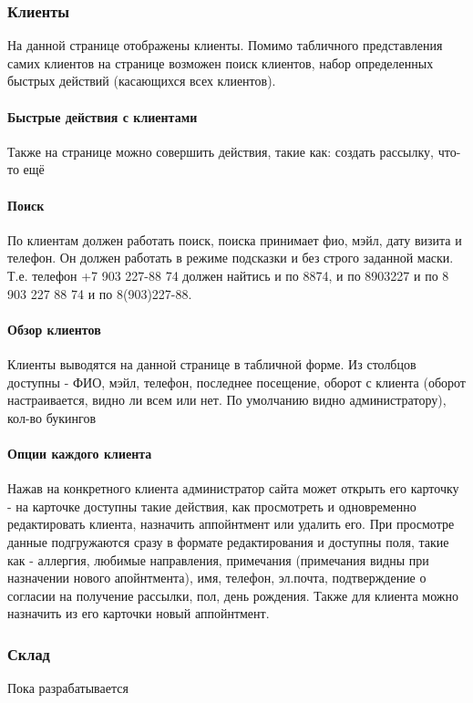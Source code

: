 \documentclass[DIV=calc, paper=a4, fontsize=11pt]{scrartcl} %
\begin{document}
\subsubsection{Клиенты}
На данной странице отображены клиенты. Помимо табличного представления самих клиентов на странице возможен поиск клиентов, набор определенных быстрых действий (касающихся всех клиентов). 

\paragraph{Быстрые действия с клиентами} Также на странице можно совершить действия, такие как: создать рассылку, что-то ещё 

\paragraph{Поиск} По клиентам должен работать поиск, поиска принимает фио, мэйл, дату визита и телефон. Он должен работать в режиме подсказки и без строго заданной маски. Т.е. телефон +7 903 227-88 74 должен найтись и по 8874, и по 8903227 и по 8 903 227 88 74 и по 8(903)227-88. 

\paragraph{Обзор клиентов} Клиенты выводятся на данной странице в табличной форме. Из столбцов доступны - ФИО, мэйл, телефон, последнее посещение, оборот с клиента (оборот настраивается, видно ли всем или нет. По умолчанию видно администратору), кол-во букингов

\paragraph{Опции каждого клиента} Нажав на конкретного клиента администратор сайта может открыть его карточку - на карточке доступны такие действия, как просмотреть и одновременно редактировать клиента, назначить аппойнтмент или удалить его. При просмотре данные подгружаются сразу в формате редактирования и доступны поля, такие как - аллергия, любимые направления, примечания (примечания видны при назначении нового апойнтмента), имя, телефон, эл.почта, подтверждение о согласии на получение рассылки, пол, день рождения. Также для клиента можно назначить из его карточки новый аппойнтмент.

\subsubsection{Склад}
Пока разрабатывается
\end{document}
